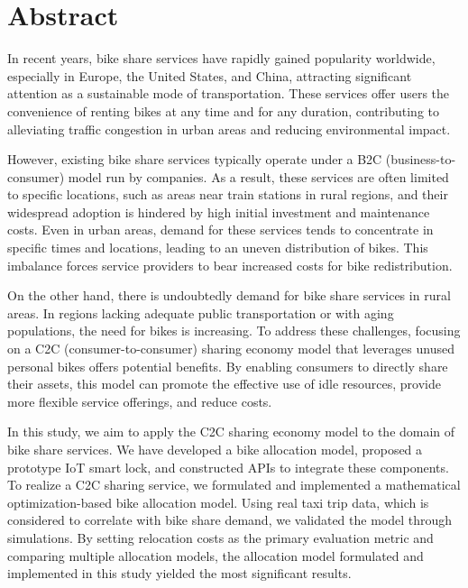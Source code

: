\section*{Abstract}
    \par In recent years, bike share services have rapidly gained popularity worldwide, especially in Europe, the United States, and China, attracting significant attention as a sustainable mode of transportation. These services offer users the convenience of renting bikes at any time and for any duration, contributing to alleviating traffic congestion in urban areas and reducing environmental impact.
    \par However, existing bike share services typically operate under a B2C (business-to-consumer) model run by companies. As a result, these services are often limited to specific locations, such as areas near train stations in rural regions, and their widespread adoption is hindered by high initial investment and maintenance costs. Even in urban areas, demand for these services tends to concentrate in specific times and locations, leading to an uneven distribution of bikes. This imbalance forces service providers to bear increased costs for bike redistribution.
    \par On the other hand, there is undoubtedly demand for bike share services in rural areas. In regions lacking adequate public transportation or with aging populations, the need for bikes is increasing. To address these challenges, focusing on a C2C (consumer-to-consumer) sharing economy model that leverages unused personal bikes offers potential benefits. By enabling consumers to directly share their assets, this model can promote the effective use of idle resources, provide more flexible service offerings, and reduce costs.
    \par In this study, we aim to apply the C2C sharing economy model to the domain of bike share services. We have developed a bike allocation model, proposed a prototype IoT smart lock, and constructed APIs to integrate these components. To realize a C2C sharing service, we formulated and implemented a mathematical optimization-based bike allocation model. Using real taxi trip data, which is considered to correlate with bike share demand, we validated the model through simulations. By setting relocation costs as the primary evaluation metric and comparing multiple allocation models, the allocation model formulated and implemented in this study yielded the most significant results.

